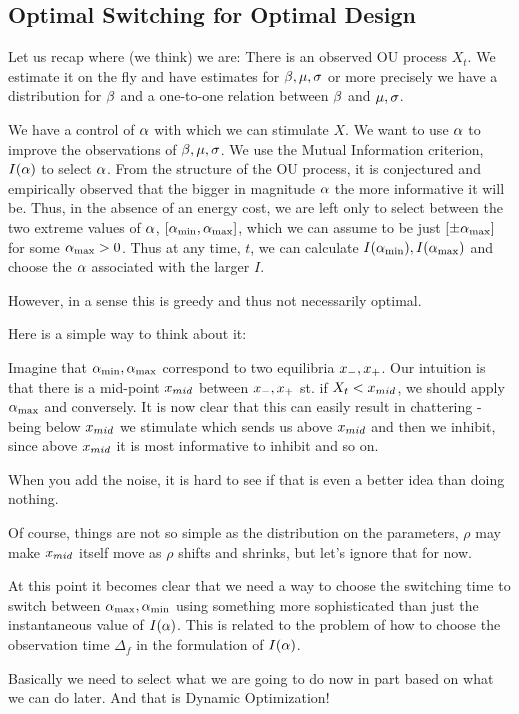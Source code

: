 \subsection{Optimal Switching for Optimal Design}
Let us recap where (we think) we are:
There is an observed OU process $X_t$. We estimate it on the fly and have
estimates for $\beta, {\mu }, \sigma$ or more precisely we have a distribution for $\beta$ and
a one-to-one relation between $\beta$ and ${\mu },\sigma$. 

We have a control of $\alpha$ with which we can stimulate $X$. We want to use $\alpha$
to improve the observations of $\beta, {\mu }, \sigma$. We use the Mutual Information
criterion, $I(\alpha)$ to select $\alpha$. From the structure of the OU process, it is
conjectured and empirically observed that the bigger in magnitude $\alpha$ the more
informative it will be. Thus, in the absence of an energy cost, we are left only
to select between the two extreme values of $\alpha$, $[{ \alpha_{\textrm{min}} }, { \alpha_{\textrm{max}} }]$, which
we can assume to be just $[\pm { \alpha_{\textrm{max}} }]$ for some ${ \alpha_{\textrm{max}} }>0$. Thus at any time, $t$,
we can calculate $I({ \alpha_{\textrm{min}} }), I({ \alpha_{\textrm{max}} })$ and choose the $\alpha$ associated with the larger $I$.

However, in a sense this is greedy and thus not necessarily optimal.

Here is a simple way to think about it:

Imagine that ${ \alpha_{\textrm{min}} }, { \alpha_{\textrm{max}} }$ correspond to two equilibria
${ x_{-} }, { x_{+} }$. Our intuition is that there is a mid-point ${ x_{mid} }$ between
${ x_{-} }, { x_{+} }$ st. if $X_t < { x_{mid} }$, we should apply ${ \alpha_{\textrm{max}} }$ and conversely. 
It is now clear that this can easily result in chattering - being below ${ x_{mid} }$
we stimulate which sends us above ${ x_{mid} }$ and then we inhibit, since above
${ x_{mid} }$ it is most informative to inhibit and so on. 

When you add the noise, it is hard to see if that is even a better idea than
doing nothing. 

Of course, things are not so simple as the distribution on the parameters,
$\rho$ may make ${ x_{mid} }$ itself move as $\rho$  shifts and shrinks, but let's
ignore that for now. 

At this point it becomes clear that we need a way to choose the switching time
to switch between  ${ \alpha_{\textrm{max}} }, { \alpha_{\textrm{min}} }$ using something more sophisticated than just
the instantaneous value of $I(\alpha)$. This is related to the problem of
how to choose the observation time $\Delta_f$ in the formulation of $I(\alpha)$. 

Basically we need to select what we are going to do now in part based on what we
can do later. And that is Dynamic Optimization!

